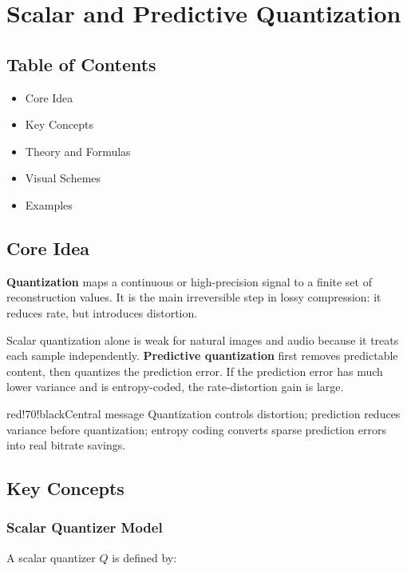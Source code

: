 \chapter{Scalar and Predictive Quantization}

\section{Table of Contents}

\begin{itemize}
  \item Core Idea
  \item Key Concepts
  \item Theory and Formulas
  \item Visual Schemes
  \item Examples
\end{itemize}

\section{Core Idea}

\textbf{Quantization} maps a continuous or high-precision signal to a finite set of reconstruction values. It is the main irreversible step in lossy compression: it reduces rate, but introduces distortion.

Scalar quantization alone is weak for natural images and audio because it treats each sample independently. \textbf{Predictive quantization} first removes predictable content, then quantizes the prediction error. If the prediction error has much lower variance and is entropy-coded, the rate-distortion gain is large.

\begin{calloutbox}{red!70!black}{Central message}
Quantization controls distortion; prediction reduces variance before quantization; entropy coding converts sparse prediction errors into real bitrate savings.
\end{calloutbox}

\section{Key Concepts}

\subsection{Scalar Quantizer Model}

A scalar quantizer $Q$ is defined by:

